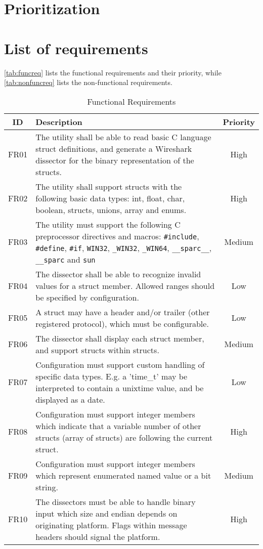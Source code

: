 \section{Prioritization}
\label{sec:reqspriority}

\section{List of requirements}
\label{sec:reqslist}
\autoref{tab:funcreq} lists the functional requirements and their priority,
while \autoref{tab:nonfuncreq} lists the non-functional requirements.

\begin{table}[ht] \center
\caption{Functional Requirements\label{tab:funcreq}}
\begin{tabular}{| c | p{9cm} | c |}
	\hline ID & Description & Priority \\
    \hline FR01 & The utility shall be able to read basic C language struct
		definitions, and generate a Wireshark dissector for the binary
		representation of the structs. & High \\
	\hline FR02 & The utility shall support structs with the following basic
		data types: int, float, char, boolean, structs, unions, array and
		enums. & High \\
	\hline FR03 & The utility must support the following C preprocessor
		directives and macros: \verb+#include+, \verb+#define+, \verb+#if+,
		\verb+WIN32+, \verb+_WIN32+, \verb+_WIN64+, \verb+__sparc__+,
		\verb+__sparc+ and \verb+sun+ & Medium \\
	\hline FR04 & The dissector shall be able to recognize invalid values for
		a struct member. Allowed ranges should be specified by configuration.
		& Low \\
	\hline FR05 & A struct may have a header and/or trailer (other registered
		protocol), which must be configurable. & Low \\
	\hline FR06 & The dissector shall display each struct member, and support
		structs within structs. & Medium \\
	\hline FR07 & Configuration must support custom handling of
		specific data types. E.g. a 'time\_t' may be interpreted to contain a
		unixtime value, and be displayed as a date. & Low \\
	\hline FR08 & Configuration must support integer members which indicate
		that a variable number of other structs (array of structs) are
		following the current struct. & High \\
	\hline FR09 & Configuration must support integer members which represent
		enumerated named value or a bit string. & Medium \\
	\hline FR10 & The dissectors must be able to handle binary input which size
		and endian depends on originating platform. Flags within message
		headers should signal the platform. & High \\
	\hline
\end{tabular}
\end{table}

